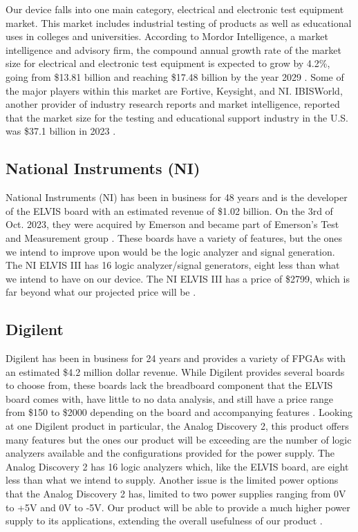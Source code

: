 Our device falls into one main category, electrical and electronic test equipment market. This market includes industrial testing of products as well as educational uses in colleges and universities. According to Mordor Intelligence, a market intelligence and advisory firm, the compound annual growth rate of the market size for electrical and electronic test equipment is expected to grow by 4.2\%, going from \$13.81 billion and reaching \$17.48 billion by the year 2029 \cite{mordor2023}. Some of the major players within this market are Fortive, Keysight, and NI. IBISWorld, another provider of industry research reports and market intelligence, reported that the market size for the testing and educational support industry in the U.S. was \$37.1 billion in 2023 \cite{ibisworld2023}.

\subsection{National Instruments (NI)}
National Instruments (NI) has been in business for 48 years and is the developer of the ELVIS board with an estimated revenue of \$1.02 billion. On the 3rd of Oct. 2023, they were acquired by Emerson and became part of Emerson's Test and Measurement group \cite{emerson2023}. These boards have a variety of features, but the ones we intend to improve upon would be the logic analyzer and signal generation. The NI ELVIS III has 16 logic analyzer/signal generators, eight less than what we intend to have on our device. The NI ELVIS III has a price of \$2799, which is far beyond what our projected price will be \cite{ni2023}.

\subsection{Digilent}
Digilent has been in business for 24 years and provides a variety of FPGAs with an estimated \$4.2 million dollar revenue. While Digilent provides several boards to choose from, these boards lack the breadboard component that the ELVIS board comes with, have little to no data analysis, and still have a price range from \$150 to \$2000 depending on the board and accompanying features \cite{digilent2023}. Looking at one Digilent product in particular, the Analog Discovery 2, this product offers many features but the ones our product will be exceeding are the number of logic analyzers available and the configurations provided for the power supply. The Analog Discovery 2 has 16 logic analyzers which, like the ELVIS board, are eight less than what we intend to supply. Another issue is the limited power options that the Analog Discovery 2 has, limited to two power supplies ranging from 0V to +5V and 0V to -5V. Our product will be able to provide a much higher power supply to its applications, extending the overall usefulness of our product \cite{analog2023}.

